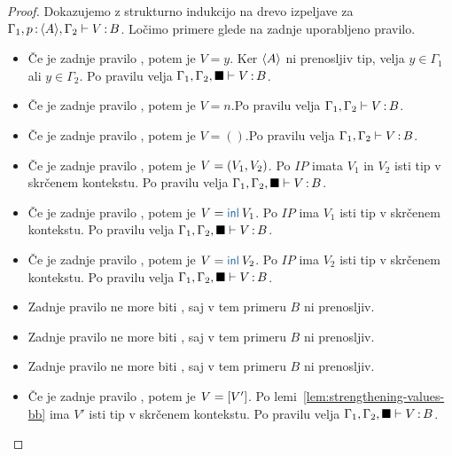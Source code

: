\begin{proof}
	Dokazujemo z strukturno indukcijo na drevo izpeljave za $\Gamma_1, p \mathinner{:} \langle A \rangle, \Gamma_2 \vdash V \mathinner{:} B$.
	Ločimo primere glede na zadnje uporabljeno pravilo.
	
	\begin{itemize}
		\item Če je zadnje pravilo , potem je $V = y$. Ker $\langle A \rangle$ ni prenosljiv tip, velja $y \in \Gamma_1$ ali $y \in \Gamma_2$.
		Po pravilu  velja $\Gamma_1, \Gamma_2, \blacksquare \vdash V \mathinner{:} B$.
		
		\item Če je zadnje pravilo , potem je $V = n$.Po pravilu  velja $\Gamma_1, \Gamma_2 \vdash V \mathinner{:} B$.

		\item Če je zadnje pravilo , potem je $V = ()$.Po pravilu  velja $\Gamma_1, \Gamma_2 \vdash V \mathinner{:} B$.
		
		\item Če je zadnje pravilo , potem je $V =( V_1 , V_2 )$.
		Po $IP$ imata $V_1$ in $V_2$ isti tip v skrčenem kontekstu.
		Po pravilu  velja $\Gamma_1, \Gamma_2, \blacksquare \vdash V \mathinner{:} B$.
		
		\item Če je zadnje pravilo , potem je $V = \tminl{V_1}$.
		Po $IP$ ima $V_1$ isti tip v skrčenem kontekstu.
		Po pravilu  velja $\Gamma_1, \Gamma_2, \blacksquare \vdash V \mathinner{:} B$.
		
		\item Če je zadnje pravilo , potem je $V = \tminl{V_2}$.
		Po $IP$ ima $V_2$ isti tip v skrčenem kontekstu.
		Po pravilu  velja $\Gamma_1, \Gamma_2, \blacksquare \vdash V \mathinner{:} B$.
		
		\item Zadnje pravilo ne more biti , saj v tem primeru $B$ ni prenosljiv.
		
		\item Zadnje pravilo ne more biti , saj v tem primeru $B$ ni prenosljiv.
		
		\item Zadnje pravilo ne more biti , saj v tem primeru $B$ ni prenosljiv.
		
		\item Če je zadnje pravilo , potem je $V = [V']$.
		Po lemi~\ref{lem:strengthening-values-bb} ima $V'$ isti tip v skrčenem kontekstu.
		Po pravilu  velja $\Gamma_1, \Gamma_2, \blacksquare \vdash V \mathinner{:} B$.
		
	\end{itemize}
\end{proof}


